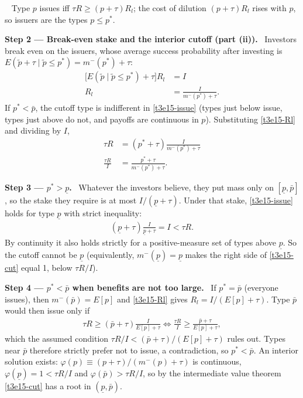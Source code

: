 \documentclass[11pt,a4paper]{article}
\newcommand{\step}[2]{\par\medskip\noindent\textbf{Step #1 --- #2.}~}
\newcommand{\answer}[1]{\par\smallskip\noindent\fbox{\textbf{Answer #1.}}~}
\begin{document}
\answer{(i)} Type $p$ issues iff $\tau R\ge(p+\tau)R_l$; the cost of dilution $(p+\tau)R_l$ rises with $p$, so issuers are the types $p\le p^*$.

\step{2}{Break-even stake and the interior cutoff (part (ii))} Investors break even on the issuers, whose average success probability after investing is $E(\tilde p+\tau\mid\tilde p\le p^*)=m^-(p^*)+\tau$:
\begin{align}
  \bigl[E(\tilde p\mid\tilde p\le p^*)+\tau\bigr]R_l &= I \nonumber\\
  R_l &= \frac{I}{m^-(p^*)+\tau}. \label{t3e15-Rl}
\end{align}
If $p^*<\bar p$, the cutoff type is indifferent in \eqref{t3e15-issue} (types just below issue, types just above do not, and payoffs are continuous in $p$). Substituting \eqref{t3e15-Rl} and dividing by $I$,
\begin{align}
  \tau R &= (p^*+\tau)\frac{I}{m^-(p^*)+\tau} \nonumber\\
  \frac{\tau R}{I} &= \frac{p^*+\tau}{m^-(p^*)+\tau}. \label{t3e15-cut}
\end{align}

\step{3}{$p^*>\underline p$} Whatever the investors believe, they put mass only on $[\underline p,\bar p]$,
so the stake they require is at most $I/(\underline p+\tau)$. Under that stake, \eqref{t3e15-issue} holds
for type $\underline p$ with strict inequality:
\begin{align}
  (\underline p+\tau)\frac{I}{\underline p+\tau} = I < \tau R. \nonumber
\end{align}
By continuity it also holds strictly for a positive-measure set of types above $\underline p$. So the
cutoff cannot be $\underline p$ (equivalently, $m^-(\underline p)=\underline p$ makes the right side of
\eqref{t3e15-cut} equal 1, below $\tau R/I$).

\step{4}{$p^*<\bar p$ when benefits are not too large} If $p^*=\bar p$ (everyone issues), then
$m^-(\bar p)=E[p]$ and \eqref{t3e15-Rl} gives $R_l=I/(E[p]+\tau)$. Type $\bar p$ would then issue only if
\begin{align}
  \tau R \ge (\bar p+\tau)\frac{I}{E[p]+\tau}
  \iff \frac{\tau R}{I} \ge \frac{\bar p+\tau}{E[p]+\tau}, \nonumber
\end{align}
which the assumed condition $\tau R/I<(\bar p+\tau)/(E[p]+\tau)$ rules out. Types near $\bar p$ therefore
strictly prefer not to issue, a contradiction, so $p^*<\bar p$. An interior solution exists:
$\varphi(p)\equiv(p+\tau)/(m^-(p)+\tau)$ is continuous, $\varphi(\underline p)=1<\tau R/I$ and
$\varphi(\bar p)>\tau R/I$, so by the intermediate value theorem \eqref{t3e15-cut} has a root in
$(\underline p,\bar p)$.
\end{document}
